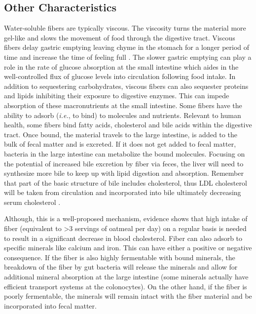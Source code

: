 \documentclass{tufte-handout}
\begin{document}
\subsection{Other Characteristics}
Water-soluble fibers are typically viscous. The viscosity turns the material more gel-like and slows the movement of food through the digestive tract. Viscous fibers delay gastric emptying leaving chyme in the stomach for a longer period of time and increase the time of feeling full \citep{Willis2009}. The slower gastric emptying can play a role in the rate of glucose absorption at the small intestine which aides in the well-controlled flux of glucose levels into circulation following food intake. In addition to sequestering carbohydrates, viscous fibers can also sequester proteins and lipids inhibiting their exposure to digestive enzymes. This can impede absorption of these macronutrients at the small intestine. Some fibers have the ability to adsorb (\textit{i.e.}, to bind) to molecules and nutrients. Relevant to human health, some fibers bind fatty acids, cholesterol and bile acids within the digestive tract. Once bound, the material travels to the large intestine, is added to the bulk of fecal matter and is excreted. If it does not get added to fecal matter, bacteria in the large intestine can metabolize the bound molecules. Focusing on the potential of increased bile excretion by fiber via feces, the liver will need to synthesize more bile to keep up with lipid digestion and absorption. Remember that part of the basic structure of bile includes cholesterol, thus LDL cholesterol will be taken from circulation and incorporated into bile ultimately decreasing serum cholesterol \citep{Brown1999}.

Although, this is a well-proposed mechanism, evidence shows that high intake of fiber (equivalent to >3 servings of oatmeal per day) on a regular basis is needed to result in a significant decrease in blood cholesterol. Fiber can also adsorb to specific minerals like calcium and iron. This can have either a positive or negative consequence. If the fiber is also highly fermentable with bound minerals, the breakdown of the fiber by gut bacteria will release the minerals and allow for additional mineral absorption at the large intestine (some minerals actually have efficient transport systems at the colonocytes). On the other hand, if the fiber is poorly fermentable, the minerals will remain intact with the fiber material and be incorporated into fecal matter.    
\end{document}
